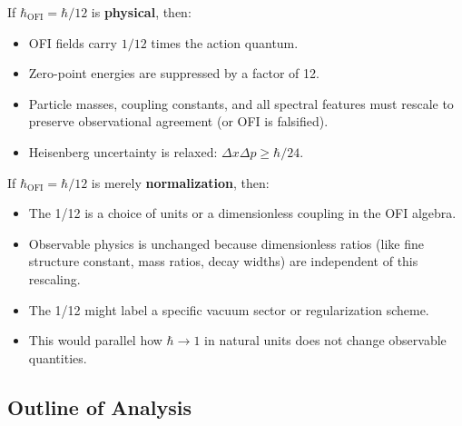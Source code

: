 \documentclass[12pt]{article}
\theoremstyle{definition}
\begin{document}
If $\hbar_{\mathrm{OFI}} = \hbar/12$ is \textbf{physical}, then:
\begin{itemize}
  \item OFI fields carry $1/12$ times the action quantum.
  \item Zero-point energies are suppressed by a factor of 12.
  \item Particle masses, coupling constants, and all spectral features must rescale
    to preserve observational agreement (or OFI is falsified).
  \item Heisenberg uncertainty is relaxed: $\Delta x \Delta p \geq \hbar/24$.
\end{itemize}

If $\hbar_{\mathrm{OFI}} = \hbar/12$ is merely \textbf{normalization}, then:
\begin{itemize}
  \item The 1/12 is a choice of units or a dimensionless coupling in the OFI algebra.
  \item Observable physics is unchanged because dimensionless ratios (like fine structure
    constant, mass ratios, decay widths) are independent of this rescaling.
  \item The 1/12 might label a specific vacuum sector or regularization scheme.
  \item This would parallel how $\hbar \to 1$ in natural units does not change
    observable quantities.
\end{itemize}

\subsection{Outline of Analysis}
\end{document}
